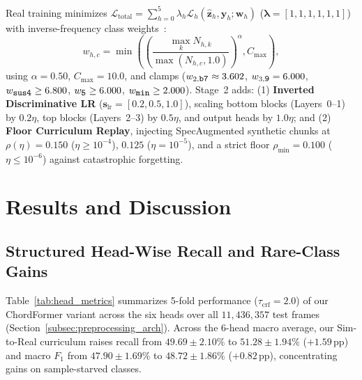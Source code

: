 \documentclass{article}
\begin{document}
Real training minimizes $\mathcal{L}_{\text{total}} = \sum_{h=0}^5 \lambda_h \mathcal{L}_h(\hat{\mathbf{z}}_h, \mathbf{y}_h; \mathbf{w}_h)$ ($\boldsymbol{\lambda} = [1, 1, 1, 1, 1, 1]$) with inverse-frequency class weights~\cite{jiang2019large,akram2026chordformer}:
\begin{equation}\label{eq:class_reweighting}
  w_{h, c} = \min \left( \left( \frac{\max_k N_{h, k}}{\max(N_{h, c}, 1.0)} \right)^{\alpha}, C_{\max} \right),
\end{equation}
using $\alpha = 0.50$, $C_{\max} = 10.0$, and clamps ($w_{2,\text{\small\texttt{b7}}} \approx 3.602$, $w_{3,\text{\small\texttt{9}}} = 6.000$, $w_{\text{\small\texttt{sus4}}} \ge 6.800$, $w_{\text{\small\texttt{5}}} \ge 6.000$, $w_{\text{\small\texttt{min}}} \ge 2.000$). Stage~2 adds: (1) \textbf{Inverted Discriminative LR} ($\mathbf{s}_{\text{lr}} = [0.2, 0.5, 1.0]$), scaling bottom blocks (Layers~0--1) by $0.2\eta$, top blocks (Layers~2--3) by $0.5\eta$, and output heads by $1.0\eta$; and (2) \textbf{Floor Curriculum Replay}, injecting SpecAugmented synthetic chunks at $\rho(\eta) = 0.150$ ($\eta \ge 10^{-4}$), $0.125$ ($\eta = 10^{-5}$), and a strict floor $\rho_{\min} = 0.100$ ($\eta \le 10^{-6}$) against catastrophic forgetting.
\section{Results and Discussion}\label{sec:results}

\subsection{Structured Head-Wise Recall and Rare-Class Gains}\label{subsec:head_wise_results}

Table~\ref{tab:head_metrics} summarizes 5-fold performance ($\tau_{\text{crf}} = 2.0$) of our ChordFormer variant across the six heads over all $11{,}436{,}357$ test frames (Section~\ref{subsec:preprocessing_arch}). Across the 6-head macro average, our Sim-to-Real curriculum raises recall from $49.69 \pm 2.10\%$ to $51.28 \pm 1.94\%$ ($+1.59\,\text{pp}$) and macro $F_1$ from $47.90 \pm 1.69\%$ to $48.72 \pm 1.86\%$ ($+0.82\,\text{pp}$), concentrating gains on sample-starved classes.
\end{document}
